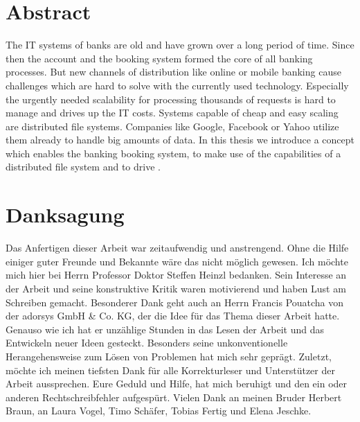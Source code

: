 \documentclass[12pt,oneside,a4paper,parskip]{scrbook}
\newcommand\blankpage{%
    \null
    \thispagestyle{empty}%
    \newpage}
\begin{document}
{\let\clearpage\relax\chapter*{Abstract}}

The IT systems of banks are old and have grown over a long period of time. Since then the account and the booking system formed the core of all banking processes. But new channels of distribution like online or mobile banking cause challenges which are hard to solve with the currently used technology. Especially the urgently needed scalability for processing thousands of requests is hard to manage and drives up the IT costs. Systems capable of cheap and easy scaling are distributed file systems. Companies like Google, Facebook or Yahoo utilize them already to handle big amounts of data. In this thesis we introduce a concept which enables the banking booking system, to make use of the capabilities of a distributed file system and to drive .

\afterpage{\blankpage}

\chapter*{Danksagung}

Das Anfertigen dieser Arbeit war zeitaufwendig und anstrengend. Ohne die Hilfe einiger guter Freunde und Bekannte wäre das nicht möglich gewesen. Ich möchte mich hier bei Herrn Professor Doktor Steffen Heinzl bedanken. Sein Interesse an der Arbeit und seine konstruktive Kritik waren motivierend und haben Lust am Schreiben gemacht. Besonderer Dank geht auch an Herrn Francis Pouatcha von der adorsys GmbH \& Co. KG, der die Idee für das Thema dieser Arbeit hatte. Genauso wie ich hat er unzählige Stunden in das Lesen der Arbeit und das Entwickeln neuer Ideen gesteckt. Besonders seine unkonventionelle Herangehensweise zum Lösen von Problemen hat mich sehr geprägt. Zuletzt, möchte ich meinen tiefsten Dank für alle Korrekturleser und Unterstützer der Arbeit aussprechen. Eure Geduld und Hilfe, hat mich beruhigt und den ein oder anderen Rechtschreibfehler aufgespürt. Vielen Dank an meinen Bruder Herbert Braun, an Laura Vogel, Timo Schäfer, Tobias Fertig und Elena Jeschke.


\afterpage{\blankpage}
\tableofcontents										



\end{document}
